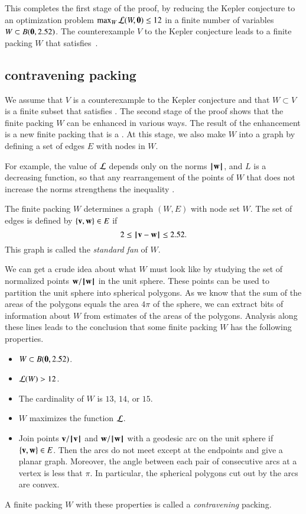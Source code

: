 This completes the first stage of the proof, by reducing the Kepler conjecture to an optimization
problem $\max_W {\mathcal L}(W,{\mathbf 0}) \le 12$ in a finite number of variables $W\subset B({\mathbf 0},2.52)$.
The counterexample $V$ to the Kepler conjecture leads to a finite packing $W$
that satisfies~.

\subsection{contravening packing}

We assume that $V$ is a counterexample to the Kepler conjecture and that $W\subset V$
is a finite subset that satisfies .
The second stage of the proof shows that the 
finite packing $W$ can be enhanced in various ways.  The result of the enhancement is
a new finite packing that is a .  At this stage, we also
make $W$ into a graph by defining a set of edges $E$ with nodes in $W$.

For example, the value of ${\mathcal L}$
depends only on the norms ${{\hskip0.1em|\hskip-0.15em|\hskip0.1em}{\mathbf w}{\hskip0.1em|\hskip-0.15em|\hskip0.1em}}$, and $L$ is a decreasing
function, so that any rearrangement of the points of $W$ that does not
increase the norms strengthens the inequality .

The finite packing $W$ determines a graph $(W,E)$ with node set $W$.  The set
of edges is defined by $\{{\mathbf v},{\mathbf w}\}\in E$ if 
\[2\le\norm{\v}{\w}\le 2.52.\] This graph is called the {\it standard
  fan} of $W$.

We can get a crude idea about what $W$ must look like by studying the
set of normalized points ${\mathbf w}/{{\hskip0.1em|\hskip-0.15em|\hskip0.1em}{\mathbf w}{\hskip0.1em|\hskip-0.15em|\hskip0.1em}}$ in the unit sphere.  These
points can be used to partition the unit sphere into spherical
polygons.  As we know that the sum of the areas of the polygons equals
the area $4\pi$ of the sphere, we can extract bits of information
about $W$ from estimates of the areas of the polygons.  Analysis along
these lines leads to the conclusion that some finite packing $W$
has the following
properties.
\begin{itemize}
\item $W\subset B({\mathbf 0},2.52)$.
\item ${\mathcal L}(W) > 12$.
\item The cardinality of $W$ is $13$, $14$, or $15$.
\item $W$ maximizes the function ${\mathcal L}$.
\item Join points ${\mathbf v}/{{\hskip0.1em|\hskip-0.15em|\hskip0.1em}{\mathbf v}{\hskip0.1em|\hskip-0.15em|\hskip0.1em}}$ and ${\mathbf w}/{{\hskip0.1em|\hskip-0.15em|\hskip0.1em}{\mathbf w}{\hskip0.1em|\hskip-0.15em|\hskip0.1em}}$ with a geodesic arc on the
unit sphere if $\{{\mathbf v},{\mathbf w}\}\in E$.  Then the arcs do not meet except at the endpoints and
give a planar graph.  Moreover, the angle between each pair of consecutive arcs at a vertex is less
that $\pi$.  In particular, the spherical polygons cut out by the arcs are convex.
\end{itemize}
A finite packing $W$ with these properties is called a {\it contravening} packing.


